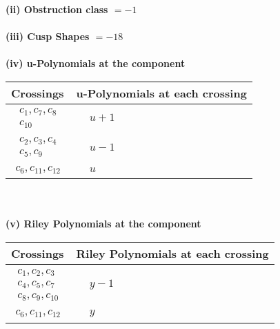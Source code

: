 \documentclass[1p]{elsarticle_modified}
\theoremstyle{definition}
\begin{document}
\flushleft \textbf{(ii) Obstruction class $= -1$}\\~\\
\flushleft \textbf{(iii) Cusp Shapes $= -18$}\\~\\
\newpage\renewcommand{\arraystretch}{1}
\flushleft \textbf{(iv) u-Polynomials at the component}\newline \\
\begin{tabular}{m{50pt}|m{274pt}}
Crossings & \hspace{64pt}u-Polynomials at each crossing \\
\hline $$\begin{aligned}c_{1},c_{7},c_{8}\\c_{10}\end{aligned}$$&$\begin{aligned}
&u+1
\end{aligned}$\\
\hline $$\begin{aligned}c_{2},c_{3},c_{4}\\c_{5},c_{9}\end{aligned}$$&$\begin{aligned}
&u-1
\end{aligned}$\\
\hline $$\begin{aligned}c_{6},c_{11},c_{12}\end{aligned}$$&$\begin{aligned}
&u
\end{aligned}$\\
\hline
\end{tabular}\\~\\
\newpage\renewcommand{\arraystretch}{1}
\flushleft \textbf{(v) Riley Polynomials at the component}\newline \\
\begin{tabular}{m{50pt}|m{274pt}}
Crossings & \hspace{64pt}Riley Polynomials at each crossing \\
\hline $$\begin{aligned}c_{1},c_{2},c_{3}\\c_{4},c_{5},c_{7}\\c_{8},c_{9},c_{10}\end{aligned}$$&$\begin{aligned}
&y-1
\end{aligned}$\\
\hline $$\begin{aligned}c_{6},c_{11},c_{12}\end{aligned}$$&$\begin{aligned}
&y
\end{aligned}$\\
\hline
\end{tabular}\\~\\
\end{document}
